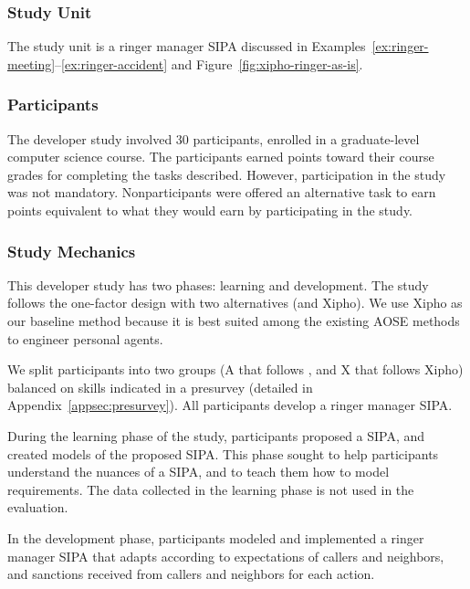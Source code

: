 \subsubsection*{Study Unit} 

The study unit is a ringer manager SIPA discussed 
in Examples~\ref{ex:ringer-meeting}--\ref{ex:ringer-accident} and Figure~\ref{fig:xipho-ringer-as-is}.

\subsubsection*{Participants}

The developer study involved 30 participants, enrolled in a
graduate-level computer science course. The participants earned points
toward their course grades for completing the tasks described. However,
participation in the study was not mandatory. Nonparticipants were
offered an alternative task to earn points equivalent to what they would
earn by participating in the study.

\subsubsection*{Study Mechanics}

This developer study has two phases: learning and development.  The study 
follows the one-factor design with two alternatives (\frameworkA and Xipho).  
We use Xipho as our baseline method because it is best suited among the
existing AOSE methods to engineer personal agents.

We split participants into two groups (A that follows \frameworkA, and X
that follows Xipho) balanced on skills indicated in a presurvey
(detailed in Appendix~\ref{appsec:presurvey}). All participants develop
a ringer manager SIPA.

\begin{description}[leftmargin=1em]

\item[Learning Phase.] During the learning phase of the study,
participants proposed a SIPA, and created models of the proposed SIPA.
This phase sought to help participants understand the nuances of a SIPA,
and to teach them how to model requirements. The data collected in the
learning phase is not used in the evaluation. 

\item[Development Phase.] In the development phase, participants
modeled and implemented a ringer manager SIPA that adapts according
to expectations of callers and 
neighbors, and sanctions received from callers and
neighbors for each action.

\end{description}

